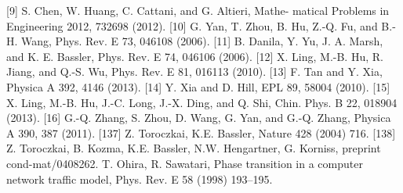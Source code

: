 \documentclass[onecolumn,preprintnumbers,amsmath,amssymb]{revtex4}
\begin{document}
\begin{thebibliography}{00}
[9] S. Chen, W. Huang, C. Cattani, and G. Altieri, Mathe- matical Problems in Engineering 2012, 732698 (2012).
[10] G. Yan, T. Zhou, B. Hu, Z.-Q. Fu, and B.-H. Wang, Phys. Rev. E 73, 046108 (2006).
[11] B. Danila, Y. Yu, J. A. Marsh, and K. E. Bassler, Phys. Rev. E 74, 046106 (2006).
[12] X. Ling, M.-B. Hu, R. Jiang, and Q.-S. Wu, Phys. Rev. E 81, 016113 (2010).
[13] F. Tan and Y. Xia, Physica A 392, 4146 (2013).
[14] Y. Xia and D. Hill, EPL 89, 58004 (2010).
[15] X. Ling, M.-B. Hu, J.-C. Long, J.-X. Ding, and Q. Shi,
Chin. Phys. B 22, 018904 (2013).
[16] G.-Q. Zhang, S. Zhou, D. Wang, G. Yan, and G.-Q.
Zhang, Physica A 390, 387 (2011).
[137] Z. Toroczkai, K.E. Bassler, Nature 428 (2004) 716.
[138] Z. Toroczkai, B. Kozma, K.E. Bassler, N.W. Hengartner, G. Korniss, preprint cond-mat/0408262.
T. Ohira, R. Sawatari, Phase transition in a computer network traffic model, Phys. Rev. E 58 (1998) 193–195.

\end{thebibliography}
\end{document}
